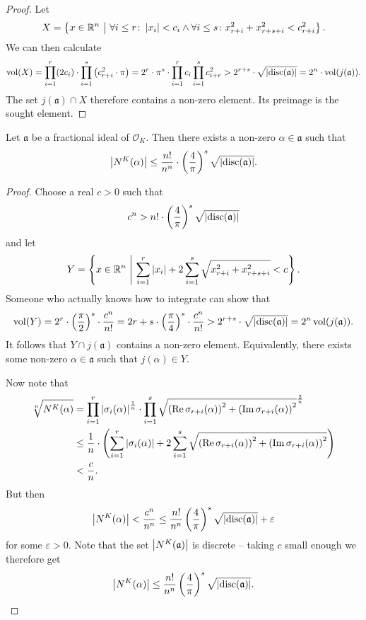 \begin{proof}
Let
\[
X = \left\{x \in \mathbb{R}^n~\middle\vert~\forall i \leq r \colon \left\lvert x_i\right\rvert < c_i \land
\forall i \leq s \colon x_{r+i}^2 + x_{r+s+i}^2 < c_{r+i}^2\right\}.
\]
We can then calculate
\[
\operatorname{vol}(X) =
\prod_{i=1}^r (2 c_i) \cdot
\prod_{i=1}^s \left(c_{r+i}^2 \cdot \pi\right) =
2^r \cdot \pi^s \cdot \prod_{i=1}^r c_i \prod_{i=1}^s c_{i+r}^2 >
2^{r+s} \cdot \sqrt{\left\lvert \operatorname{disc}(\mathfrak{a})\right\rvert} =
2^n \cdot \operatorname{vol}(j(\mathfrak{a})).
\]
The set $j(\mathfrak{a}) \cap X$ therefore contains a non-zero
element. Its preimage is the sought element.
\end{proof}

\begin{izrek}[Minkowski]
Let $\mathfrak{a}$ be a fractional ideal of $\mathcal{O}_K$. Then
there exists a non-zero $\alpha \in \mathfrak{a}$ such that
\[
\left\lvert N^K(\alpha)\right\rvert \leq
\frac{n!}{n^n} \cdot \left(\frac{4}{\pi}\right)^s
\sqrt{\left\lvert \operatorname{disc}(\mathfrak{a})\right\rvert}.
\]
\end{izrek}

\begin{proof}
Choose a real $c > 0$ such that
\[
c^n > n! \cdot \left(\frac{4}{\pi}\right)^s
\sqrt{\left\lvert \operatorname{disc}(\mathfrak{a})\right\rvert}
\]
and let
\[
Y = \left\{x \in \mathbb{R}^n~\middle\vert~\sum_{i=1}^r \left\lvert x_i\right\rvert +
2 \sum_{i=1}^s \sqrt{x_{r+i}^2 + x_{r+s+i}^2} < c\right\}.
\]
Someone who actually knows how to integrate can show that
\[
\operatorname{vol}(Y) =
2^r \cdot \left(\frac{\pi}{2}\right)^s \cdot \frac{c^n}{n!} =
2{r+s} \cdot \left(\frac{\pi}{4}\right)^s \cdot \frac{c^n}{n!} >
2^{r+s} \cdot \sqrt{\left\lvert \operatorname{disc}(\mathfrak{a})\right\rvert} =
2^n \operatorname{vol}(j(\mathfrak{a})).
\]
It follows that $Y \cap j(\mathfrak{a})$ contains a non-zero
element. Equivalently, there exists some non-zero
$\alpha \in \mathfrak{a}$ such that $j(\alpha) \in Y$.

Now note that
\begin{align*}
\sqrt[n]{N^K(\alpha)} &=
\prod_{i=1}^r \left\lvert \sigma_i(\alpha)\right\rvert^{\frac{1}{n}} \cdot
\prod_{i=1}^s \sqrt{\left(\operatorname{Re} \sigma_{r+i}(\alpha)\right)^2 +
\left(\operatorname{Im} \sigma_{r+i}(\alpha)\right)^2}^{\frac{2}{n}}
\\
&\leq
\frac{1}{n} \cdot \left(
\sum_{i=1}^r \left\lvert \sigma_i(\alpha)\right\rvert + 2 \sum_{i=1}^s
\sqrt{\left(\operatorname{Re} \sigma_{r+i}(\alpha)\right)^2 +
\left(\operatorname{Im} \sigma_{r+i}(\alpha)\right)^2}\right)
\\
&< \frac{c}{n}.
\end{align*}
But then
\[
\left\lvert N^K(\alpha)\right\rvert <
\frac{c^n}{n^n} \leq
\frac{n!}{n^n} \left(\frac{4}{\pi}\right)^s
\sqrt{\left\lvert \operatorname{disc}(\mathfrak{a})\right\rvert} + \varepsilon
\]
for some $\varepsilon > 0$. Note that the set
$\left\lvert N^K(\mathfrak{a})\right\rvert$ is discrete -- taking $c$ small enough
we therefore get
\[
\left\lvert N^K(\alpha)\right\rvert \leq
\frac{n!}{n^n} \left(\frac{4}{\pi}\right)^s
\sqrt{\left\lvert \operatorname{disc}(\mathfrak{a})\right\rvert}. \qedhere
\]
\end{proof}


